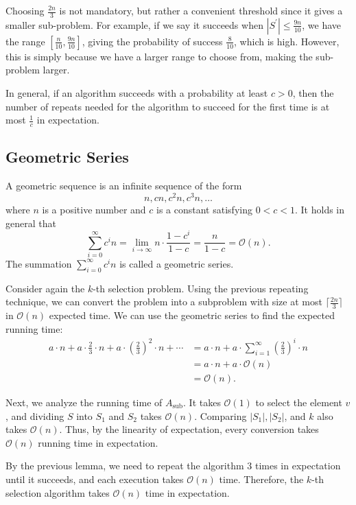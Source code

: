 \begin{eg}
  \begin{remark}
    Choosing \(\frac{2n}{3}\) is not mandatory, but rather a convenient threshold since it gives a smaller sub-problem. For example, if we say it succeeds when \(|S^{\prime}| \leq \frac{9n}{10}\), we have the range \([\frac{n}{10}, \frac{9n}{10}]\), giving the probability of success \(\frac{8}{10}\), which is high. However, this is simply because we have a larger range to choose from, making the sub-problem larger. 
  \end{remark}
\end{eg}

In general, if an algorithm succeeds with a probability at least \(c > 0\), then the number of repeats needed for the algorithm to succeed for the first time is at most \(\frac{1}{c}\) in expectation. 

\subsection{Geometric Series}
A geometric sequence is an infinite sequence of the form 
\[
  n, cn, c^2 n, c^3 n, \dots 
\]
where \(n\) is a positive number and \(c\) is a constant satisfying \(0 < c < 1\). It holds in general that 
\[
  \sum_{i = 0}^{\infty} c^i n = \lim_{i \to \infty} n \cdot \dfrac{1 - c^i}{1 - c} = \dfrac{n}{1 - c} = \mathcal{O}(n).
\]
The summation \(\sum_{i = 0}^{\infty} c^i n\) is called a geometric series. 

Consider again the \(k\)-th selection problem. Using the previous repeating technique, we can convert the problem into a subproblem with size at most \(\lceil \frac{2n}{3} \rceil\) in \(\mathcal{O}(n)\) expected time. We can use the geometric series to find the expected running time: 
\[
  \begin{aligned}
    a \cdot n + a \cdot \frac{2}{3} \cdot n + a \cdot \left(\frac{2}{3}\right)^2 \cdot n + \cdots &= a \cdot n + a \cdot \sum_{i = 1}^{\infty} \left(\frac{2}{3}\right)^i \cdot n \\
    &= a \cdot n + a \cdot \mathcal{O}(n) \\
    &= \mathcal{O}(n).
  \end{aligned}
\]

Next, we analyze the running time of \(A_{\text{sub}}\). It takes \(\mathcal{O}(1)\) to select the element \(v\), and dividing \(S\) into \(S_1\) and \(S_2\) takes \(\mathcal{O}(n)\). Comparing \(|S_1|, |S_2|\), and \(k\) also takes \(\mathcal{O}(n)\). Thus, by the linearity of expectation, every conversion takes \(\mathcal{O}(n)\) running time in expectation. 

By the previous lemma, we need to repeat the algorithm 3 times in expectation until it succeeds, and each execution takes \(\mathcal{O}(n)\) time. Therefore, the \(k\)-th selection algorithm takes \(\mathcal{O}(n)\) time in expectation.  
